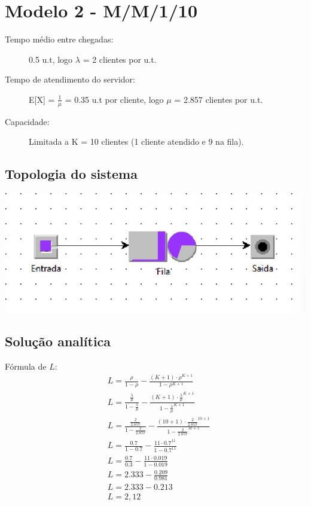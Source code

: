 \documentclass[12pt,a4paper]{article}
\begin{document}
\newpage
\section{Modelo 2 - M/M/1/10}

\begin{description}
	\item[Tempo médio entre chegadas:] 0.5 u.t, logo $\lambda$ = 2 clientes por u.t.
	\item[Tempo de atendimento do servidor:] E[X] = $\frac{1}{\mu}$ = 0.35 u.t por cliente, logo $\mu$ = 2.857 clientes por u.t.
	\item[Capacidade:] Limitada a K = 10 clientes (1 cliente atendido e 9 na fila).
\end{description}

\subsection{Topologia do sistema}
\includegraphics[width=\linewidth]{topologias/m2.jpg}

\subsection{Solução analítica}

Fórmula de \(L\):
\begin{equation*}
	\begin{aligned}
		&L = \frac{\rho}{1 - \rho} - \frac{(K + 1) \cdot \rho^{K+1}}{1 - \rho^{K+1}} \\
		&L = \frac{\frac{\lambda}{\mu}}{1 - \frac{\lambda}{\mu}} - \frac{(K + 1) \cdot \frac{\lambda}{\mu}^{K+1}}{1 - \frac{\lambda}{\mu}^{K+1}} \\
		&L = \frac{\frac{2}{2.857}}{1 - \frac{2}{2.857}} - \frac{(10 + 1) \cdot \frac{2}{2.857}^{10+1}}{1 - \frac{2}{2.857}^{10+1}} \\
		&L = \frac{0.7}{1 - 0.7} - \frac{11 \cdot 0.7^{11}}{1 - 0.7^{11}} \\
		&L = \frac{0.7}{0.3} - \frac{11 \cdot 0.019}{1 - 0.019} \\
		&L = 2.333 - \frac{0.209}{0.981} \\
		&L = 2.333 - 0.213 \\
		&L = {2,12}
	\end{aligned}
\end{equation*}
\end{document}
